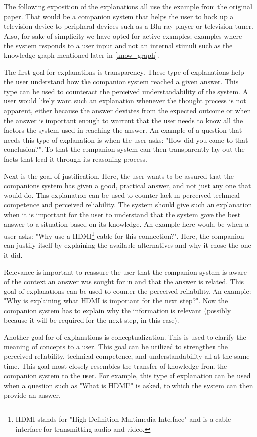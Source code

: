 \documentclass[a4paper]{article}
\begin{document}
The following exposition of the explanations all use the example from the original paper. That would be a companion system that helps the user to hock up a television device to peripheral devices such as a Blu ray player or television tuner. Also, for sake of simplicity we have opted for active examples; examples where the system responds to a user input and not an internal stimuli such as the knowledge graph mentioned later in \ref{know_graph}.

The first goal for explanations is transparency. These type of explanations help the user understand how the companion system reached a given answer. This type can be used to counteract the perceived understandability of the system. A user would likely want such an explanation whenever the thought process is not apparent, either because the answer deviates from the expected outcome or when the answer is important enough to warrant that the user needs to know all the factors the system used in reaching the answer. An example of a question that needs this type of explanation is when the user asks: "How did you come to that conclusion?". To that the companion system can then transparently lay out the facts that lead it through its reasoning process.

Next is the goal of justification. Here, the user wants to be assured that the companions system has given a good, practical answer, and not just any one that would do. This explanation can be used to counter lack in perceived technical competence and perceived reliability. The system should give such an explanation when it is important for the user to understand that the system gave the best answer to a situation based on its knowledge. An example here would be when a user asks: "Why use a HDMI\footnote{HDMI stands for "High-Definition Multimedia Interface" and is a cable interface for transmitting audio and video.} cable for this connection?". Here, the companion can justify itself by explaining the available alternatives and why it chose the one it did.

Relevance is important to reassure the user that the companion system is aware of the context an answer was sought for in and that the answer is related. This goal of explanations can be used to counter the perceived reliability. An example: "Why is explaining what HDMI is important for the next step?". Now the companion system has to explain why the information is relevant (possibly because it will be required for the next step, in this case).

Another goal for of explanations is conceptualization. This is used to clarify the meaning of concepts to a user. This goal can be utilized to strengthen the perceived reliability, technical competence, and understandability all at the same time. This goal most closely resembles the transfer of knowledge from the companion system to the user. For example, this type of explanation can be used when a question such as "What is HDMI?" is asked, to which the system can then provide an answer.
\end{document}
